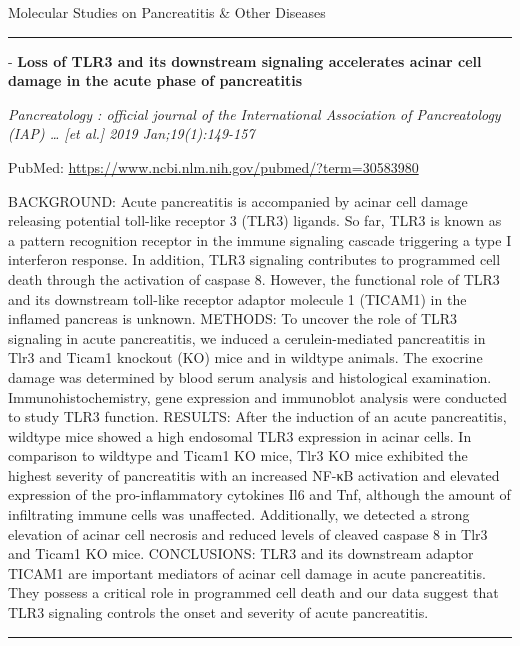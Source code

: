 \documentclass[]{article}
\begin{document}
Molecular Studies on Pancreatitis \& Other Diseases

\begin{center}\rule{0.5\linewidth}{\linethickness}\end{center}

 - \textbf{Loss of TLR3 and its downstream signaling accelerates acinar
cell damage in the acute phase of pancreatitis}

\emph{Pancreatology : official journal of the International Association
of Pancreatology (IAP) \ldots{} {[}et al.{]} 2019 Jan;19(1):149-157}

PubMed: \url{https://www.ncbi.nlm.nih.gov/pubmed/?term=30583980}

BACKGROUND: Acute pancreatitis is accompanied by acinar cell damage
releasing potential toll-like receptor 3 (TLR3) ligands. So far, TLR3 is
known as a pattern recognition receptor in the immune signaling cascade
triggering a type I interferon response. In addition, TLR3 signaling
contributes to programmed cell death through the activation of caspase
8. However, the functional role of TLR3 and its downstream toll-like
receptor adaptor molecule 1 (TICAM1) in the inflamed pancreas is
unknown. METHODS: To uncover the role of TLR3 signaling in acute
pancreatitis, we induced a cerulein-mediated pancreatitis in Tlr3 and
Ticam1 knockout (KO) mice and in wildtype animals. The exocrine damage
was determined by blood serum analysis and histological examination.
Immunohistochemistry, gene expression and immunoblot analysis were
conducted to study TLR3 function. RESULTS: After the induction of an
acute pancreatitis, wildtype mice showed a high endosomal TLR3
expression in acinar cells. In comparison to wildtype and Ticam1 KO
mice, Tlr3 KO mice exhibited the highest severity of pancreatitis with
an increased NF-κB activation and elevated expression of the
pro-inflammatory cytokines Il6 and Tnf, although the amount of
infiltrating immune cells was unaffected. Additionally, we detected a
strong elevation of acinar cell necrosis and reduced levels of cleaved
caspase 8 in Tlr3 and Ticam1 KO mice. CONCLUSIONS: TLR3 and its
downstream adaptor TICAM1 are important mediators of acinar cell damage
in acute pancreatitis. They possess a critical role in programmed cell
death and our data suggest that TLR3 signaling controls the onset and
severity of acute pancreatitis.

{}

{}

\begin{center}\rule{0.5\linewidth}{\linethickness}\end{center}
\end{document}
